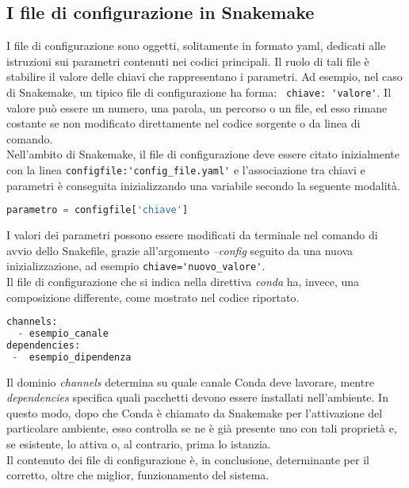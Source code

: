 \subsection{I file di configurazione in Snakemake}
I file di configurazione sono oggetti, solitamente in formato yaml, dedicati alle istruzioni sui parametri contenuti nei codici principali. Il ruolo di tali file è stabilire il valore delle chiavi che rappresentano i parametri. Ad esempio, nel caso di Snakemake, un tipico file di configurazione ha forma: \verb! chiave: 'valore'!. Il valore può essere un numero, una parola, un percorso o un file, ed esso rimane costante se non modificato direttamente nel codice sorgente o da linea di comando. \\ Nell'ambito di Snakemake, il file di configurazione deve essere citato inizialmente con la linea \verb!configfile:'config_file.yaml'! e l'associazione tra chiavi e parametri è conseguita inizializzando una variabile secondo la seguente modalità.
\begin{lstlisting}[language=Python]
parametro = configfile['chiave']
\end{lstlisting}
I valori dei parametri possono essere modificati da terminale nel comando di avvio dello Snakefile, grazie all'argomento \textit{--config} seguito da una nuova inizializzazione, ad esempio \verb!chiave='nuovo_valore'!. \\
Il file di configurazione che si indica nella direttiva \textit{conda} ha, invece, una composizione differente, come mostrato nel codice riportato.
\begin{lstlisting}[language=Python]
channels:
  - esempio_canale
dependencies:
 -  esempio_dipendenza
\end{lstlisting} 
Il dominio \textit{channels} determina su quale canale Conda deve lavorare, mentre \textit{dependencies} specifica quali pacchetti devono essere installati nell'ambiente. In questo modo, dopo che Conda è chiamato da Snakemake per l'attivazione del particolare ambiente, esso controlla se ne è già presente uno con tali proprietà e, se esistente, lo attiva o, al contrario, prima lo istanzia. \\
Il contenuto dei file di configurazione è, in conclusione, determinante per il corretto, oltre che miglior, funzionamento del sistema.

